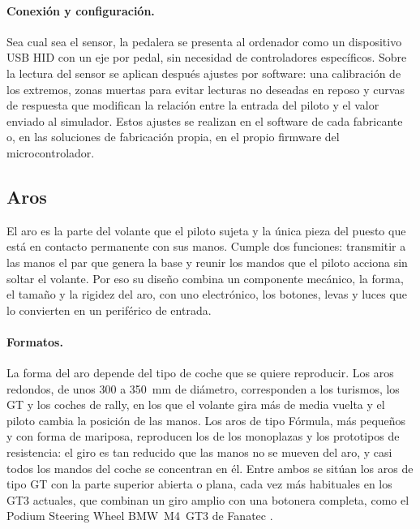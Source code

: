 \paragraph{Conexión y configuración.}
Sea cual sea el sensor, la pedalera se presenta al ordenador como un dispositivo USB HID con un eje por pedal, sin necesidad de controladores específicos. Sobre la lectura del sensor se aplican después ajustes por software: una calibración de los extremos, zonas muertas para evitar lecturas no deseadas en reposo y curvas de respuesta que modifican la relación entre la entrada del piloto y el valor enviado al simulador. Estos ajustes se realizan en el software de cada fabricante o, en las soluciones de fabricación propia, en el propio firmware del microcontrolador.
\subsection{Aros}
\label{sec:aros}

El aro es la parte del volante que el piloto sujeta y la única pieza del puesto que está en contacto permanente con sus manos. Cumple dos funciones: transmitir a las manos el par que genera la base y reunir los mandos que el piloto acciona sin soltar el volante. Por eso su diseño combina un componente mecánico, la forma, el tamaño y la rigidez del aro, con uno electrónico, los botones, levas y luces que lo convierten en un periférico de entrada.

\paragraph{Formatos.}
La forma del aro depende del tipo de coche que se quiere reproducir. Los aros redondos, de unos 300 a 350~mm de diámetro, corresponden a los turismos, los GT y los coches de rally, en los que el volante gira más de media vuelta y el piloto cambia la posición de las manos. Los aros de tipo Fórmula, más pequeños y con forma de mariposa, reproducen los de los monoplazas y los prototipos de resistencia: el giro es tan reducido que las manos no se mueven del aro, y casi todos los mandos del coche se concentran en él. Entre ambos se sitúan los aros de tipo GT con la parte superior abierta o plana, cada vez más habituales en los GT3 actuales, que combinan un giro amplio con una botonera completa, como el Podium Steering Wheel BMW~M4~GT3 de Fanatec \parencite{fanatec_web}.

